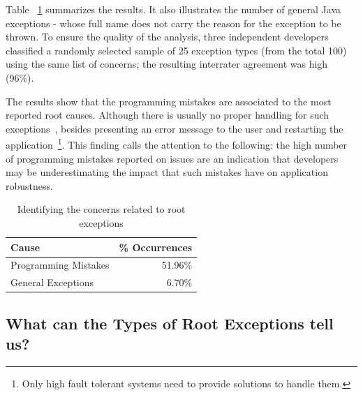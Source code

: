 \documentclass[conference]{IEEEtran}
\begin{document}
Table ~\ref{tab:causes} summarizes the results. It also illustrates the number of general Java exceptions - 
whose full name does not carry the reason for the exception to be thrown.
To ensure the quality of the analysis, three independent developers classified a randomly selected
sample of 25 exception types (from the total 100) using the same list of concerns;
the resulting interrater agreement was high (96\%). 

The results show that the programming mistakes are associated to the most reported root causes. 
Although there is usually no proper handling for such exceptions~\cite{wirfs2006toward}, 
besides presenting an error message to the user and restarting the application~\footnote{Only 
high fault tolerant systems need to provide solutions to handle them.}.  
This finding calls the attention to the following: the high number of programming mistakes reported 
on issues are an indication that developers may be underestimating the impact that such 
mistakes have on application robustness.

\begin{table}
  \centering
  \begin{tabular}{lr}
    \hline
    \bfseries{Cause} &  \bfseries{\% Occurrences} \\
    \hline
      Programming Mistakes &  51.96\%\\ 
      General Exceptions   &  6.70\%\\
    \hline
 \end{tabular}
  \caption{Identifying the concerns related to root exceptions}
  \label{tab:causes}
\end{table}


\noindent {}

\subsection{What can the Types of Root Exceptions tell us?}
\end{document}

